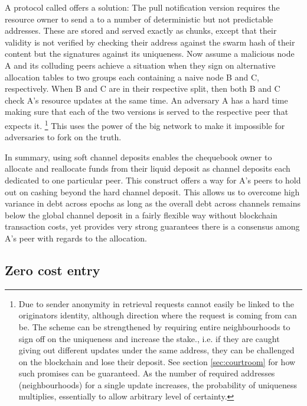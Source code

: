 A protocol called  offers a solution: 
The pull notification version requires the resource owner to send a  to a number of deterministic but not predictable addresses. These are stored and served exactly as chunks, except that their validity is not verified by checking  their address against the swarm hash of their content but the signatures against its uniqueness. Now assume a malicious node A and its colluding peers achieve a situation when they sign on alternative allocation tables to two groups each containing a naive node B and C, respectively. When B and C are in their respective split, then both B and C check A's resource updates at the same time. An adversary A has a hard time making sure that each of the two versions is served to the respective peer that expects it.%
%
\footnote{Due to sender anonymity in retrieval requests cannot easily be linked to the originators identity, although direction where the request is coming from can be. The scheme can be strengthened by requiring entire neighbourhoods to sign off on the uniqueness and increase the stake., i.e. if they are caught giving out different updates under the same address, they can be challenged on the blockchain and lose their deposit. See section \ref{sec:courtroom} for how such promises can be guaranteed. 
As the number of required addresses (neighbourhoods) for a single update increases, the probability of uniqueness multiplies, essentially to allow arbitrary level of certainty.}
%
This uses the power of the big network to make it impossible for adversaries to fork on the truth.

In summary, using soft channel deposits enables the chequebook owner to allocate and reallocate funds from their liquid deposit as channel deposits each dedicated to one particular peer. 
This construct offers a way for A's peers to hold out on cashing beyond the hard channel deposit. This  allows us to overcome high variance in debt across epochs as long as the overall debt across channels remains below the global channel deposit in a fairly flexible way without blockchain transaction costs, yet provides very strong guarantees there is a consensus among A's peer with regards to the allocation. 

\subsection{Zero cost entry}

